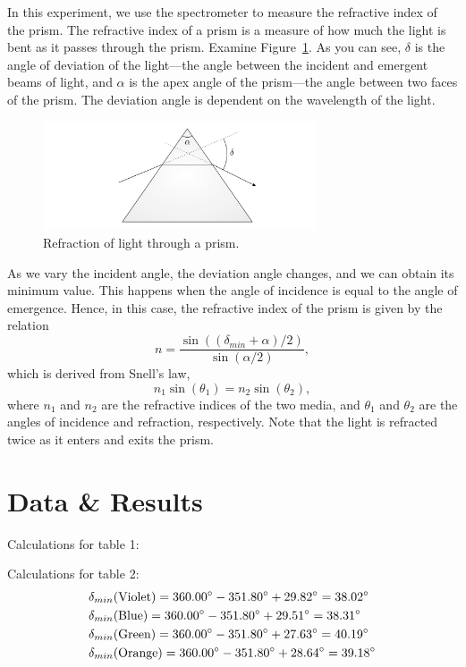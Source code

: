 \documentclass[10pt]{article}
\begin{document}
In this experiment, we use the spectrometer to measure the refractive index of the prism. The refractive index of a prism is a measure of how much the light is bent as it passes through the prism. Examine Figure~\ref{fig:1}. As you can see, $\delta$ is the angle of deviation of the light---the angle between the incident and emergent beams of light, and $\alpha$ is the apex angle of the prism---the angle between two faces of the prism. The deviation angle is dependent on the wavelength of the light.
\begin{figure}[ht]
    \centering
    \includegraphics[width=0.72\textwidth]{figures/f1.pdf}
    \caption{Refraction of light through a prism.}
    \label{fig:1}
\end{figure}
As we vary the incident angle, the deviation angle changes, and we can obtain its minimum value. This happens when the angle of incidence is equal to the angle of emergence. Hence, in this case, the refractive index of the prism is given by the relation
\begin{equation}
    n = \frac{\sin\left((\delta_{min}+\alpha) / 2 \right)}{\sin\left(\alpha / 2\right)},
\end{equation}
which is derived from Snell's law,
\begin{equation}
    n_1 \sin(\theta_1) = n_2 \sin(\theta_2),
\end{equation}
where $n_1$ and $n_2$ are the refractive indices of the two media, and $\theta_1$ and $\theta_2$ are the angles of incidence and refraction, respectively. Note that the light is refracted twice as it enters and exits the prism. 

\section{Data \& Results}

Calculations for table 1:


Calculations for table 2:
\begin{align}
    &\delta_{min}(\text{Violet}) = 360.00\degree-351.80\degree+29.82\degree = 38.02\degree \\
    &\delta_{min}(\text{Blue}) = 360.00\degree-351.80\degree+29.51\degree = 38.31\degree \\
    &\delta_{min}(\text{Green}) = 360.00\degree-351.80\degree+27.63\degree = 40.19\degree \\
    &\delta_{min}(\text{Orange}) = 360.00\degree-351.80\degree+28.64\degree = 39.18\degree 
\end{align}
\end{document}
